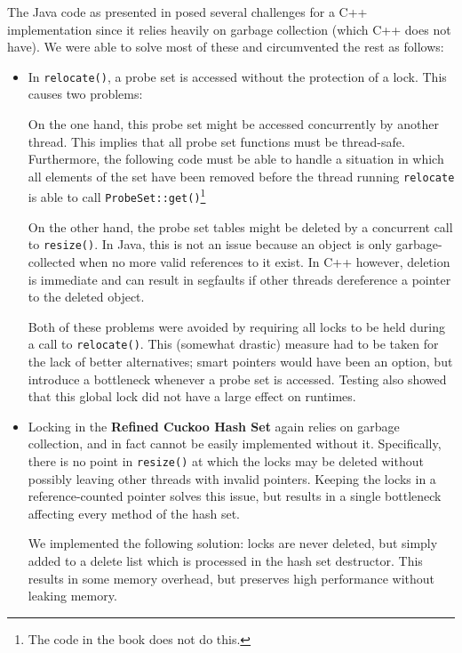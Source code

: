 \documentclass[a4paper,10pt]{article}
\begin{document}
The Java code as presented in \cite{herlihy} posed several challenges for
a C++ implementation since it relies heavily on garbage collection (which C++
does not have). We were able to solve most of these and circumvented the rest
as follows:

\begin{itemize}
\item In \lstinline|relocate()|, a probe set is accessed without the
    protection of a lock. This causes two problems:
    
    On the one hand, this probe set might be accessed concurrently
    by another thread. This implies that all probe set functions must be
    thread-safe. Furthermore, the following code must be able to handle a
    situation in which all elements of the set have been removed before the
    thread running \lstinline|relocate| is able to call
    \lstinline|ProbeSet::get()|\footnote{The code in the book does not do
    this.}
    
    On the other hand, the probe set tables might be deleted by a concurrent
    call to \lstinline|resize()|. In Java, this is not an issue because an
    object is only garbage-collected when no more valid references to it exist.
    In C++ however, deletion is immediate and can result in segfaults if other
    threads dereference a pointer to the deleted object. 
    
    Both of these problems were avoided by requiring all locks to be held during
    a call to \lstinline|relocate()|. This (somewhat drastic) measure had to be
    taken for the lack of better alternatives; smart pointers would have been
    an option, but introduce a bottleneck whenever a probe set is accessed.
    Testing also showed that this global lock did not have a large effect on runtimes.

\item Locking in the \textbf{Refined Cuckoo Hash Set} again relies on garbage collection, and
    in fact cannot be easily implemented without it. Specifically, there is no point
    in \lstinline|resize()| at which the locks may be deleted without possibly leaving
    other threads with invalid pointers. Keeping the locks in a reference-counted pointer
    solves this issue, but results in a single bottleneck affecting every method of the 
    hash set.
    
    We implemented the following solution: locks are never deleted, but simply added
    to a delete list which is processed in the hash set destructor. This results in
    some memory overhead, but preserves high performance without leaking memory.
\end{itemize}
\end{document}
